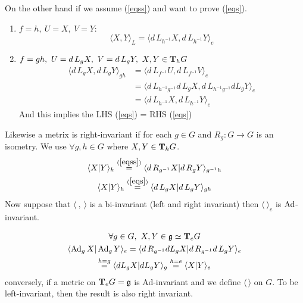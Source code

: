 On the other hand if we assume (\ref{eqss}) and want to prove (\ref{eqs}).
\begin{enumerate}[1)]
    \item $f=h,\ U=X,\ V = Y$: 
        $$ \langle X, Y \rangle_L = \langle d\, L_{h^{-1}} X, d\, L_{h^{-1}}Y\rangle_e$$
    \item $f=gh,\ U = d\, L_gX,\ V=d\, L_g Y,\ X,Y\in \tnsp_hG$
        \begin{align*}
            \langle d\, L_gX, d\,L_gY\rangle_{gh} &= \langle d\, L_{f^{-1}} U , d\, L_{f^{-1}} V \rangle_e \\
                                                  &= \langle d\,L_{h^{-1}g^{-1}} d\,L_g X , d\, L_{h^{-1}g^{-1}} dL_g Y \rangle_e\\
                                                  &= \langle d\, L_{h^{-1}}X, d\, L_{h^{-1}} Y \rangle_e 
        \end{align*}
        And this implies the LHS (\ref{eqs}) = RHS (\ref{eqs})
\end{enumerate}
Likewise a metrix is right-invariant if for each $g\in G$ and $R_g: G\to G$ is an isometry. We use $\forall g,h \in G$ where $X,Y\in \text{\textbf{T}}_h G$. 
\begin{gather*}
    \langle X|Y \rangle_h \overset{(\ref{eqss})}{=} \langle d\, R _{g^{-1}} X | d\, R_gY \rangle_{g^{-1}h} \\
    \langle X|Y\rangle_h \overset{(\ref{eqs})}{=} \langle d\, L_g X | d\, L_g Y \rangle _{gh}
\end{gather*}
Now suppose that $\langle\ ,\ \rangle$ is a bi-invariant (left and right invariant) then $\langle \ \rangle_e$ is  $\operatorname{Ad}$-invariant.

\begin{gather*}
\forall g\in G,\ X,Y\in \mathfrak{g}\simeq \text{\textbf{T}}_e G  \\
\langle \operatorname{Ad}_g X | \operatorname{Ad}_g Y \rangle_e = \langle d\,R_{g^{-1}}dL_g X | d\, R_{g^{-1}} d\, L_g Y \rangle_e\\
\overset{h=g}{=} \langle dL_g X | dL_g Y \rangle_g \overset{h=e}{=} \langle X| Y\rangle_e
\end{gather*}
conversely, if a metric on $\text{\textbf{T}}_eG = \mathfrak{g}$ is Ad-invariant and we define $\langle\, \rangle$ on $G$. To be left-invariant, then the result is also right invariant.

